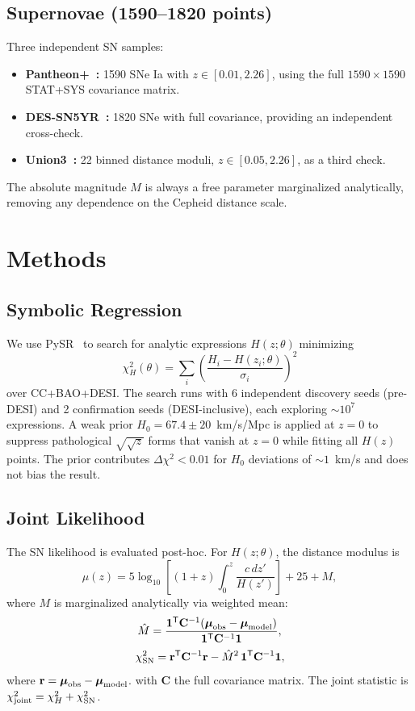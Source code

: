 \documentclass[twocolumn]{aastex631}
\begin{document}
\subsection{Supernovae (1590--1820 points)}
Three independent SN samples:
\begin{itemize}
  \item \textbf{Pantheon+~\cite{pantheon_plus}:} 1590 SNe Ia with
        $z\in[0.01,2.26]$, using the full $1590\times1590$ STAT+SYS
        covariance matrix.
  \item \textbf{DES-SN5YR~\cite{des_sn5yr}:} 1820 SNe with full
        covariance, providing an independent cross-check.
  \item \textbf{Union3~\cite{union3}:} 22 binned distance moduli,
        $z\in[0.05,2.26]$, as a third check.
\end{itemize}
The absolute magnitude $M$ is always a free parameter marginalized
analytically, removing any dependence on the Cepheid distance scale.

\section{Methods}
\label{sec:methods}

\subsection{Symbolic Regression}
We use PySR~\cite{pysr} to search for analytic expressions
$H(z;\theta)$ minimizing
\[
\chi^2_H(\theta) = \sum_i \left(\frac{H_i - H(z_i;\theta)}{\sigma_i}\right)^2
\]
over CC+BAO+DESI.  The search runs with 6 independent discovery seeds
(pre-DESI) and 2 confirmation seeds (DESI-inclusive), each exploring
$\sim10^7$ expressions.  A weak prior $H_0=67.4\pm20$~km/s/Mpc is
applied at $z=0$ to suppress pathological $\sqrt{\sqrt{z}}$ forms that
vanish at $z=0$ while fitting all $H(z)$ points.  The prior contributes
$\Delta\chi^2<0.01$ for $H_0$ deviations of $\sim1$~km/s and does not
bias the result.

\subsection{Joint Likelihood}
The SN likelihood is evaluated post-hoc.  For $H(z;\theta)$, the
distance modulus is
\[
\mu(z) = 5\log_{10}\!\left[(1+z)\int_0^z\frac{c\,dz'}{H(z')}\right] + 25 + M,
\]
where $M$ is marginalized analytically via weighted mean:
\[
\hat{M} = \frac{\mathbf{1}^\mathsf{T}\mathbf{C}^{-1}
(\boldsymbol{\mu}_{\rm obs}-\boldsymbol{\mu}_{\rm model})}
{\mathbf{1}^\mathsf{T}\mathbf{C}^{-1}\mathbf{1}},
\]
\[
\chi^2_{\rm SN} =
\mathbf{r}^\mathsf{T}\mathbf{C}^{-1}\mathbf{r}
- \hat{M}^2\,\mathbf{1}^\mathsf{T}\mathbf{C}^{-1}\mathbf{1},
\]
where $\mathbf{r} = \boldsymbol{\mu}_{\rm obs}-\boldsymbol{\mu}_{\rm model}$.
with $\mathbf{C}$ the full covariance matrix.  The joint statistic is
$\chi^2_{\rm joint}=\chi^2_H+\chi^2_{\rm SN}$.
\end{document}
